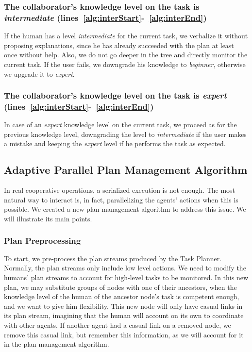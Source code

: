 \subsubsection{The collaborator's knowledge level on the task is \textit{intermediate} (lines~\ref{alg:interStart}-~\ref{alg:interEnd})}
 If the human has a level \textit{intermediate} for the current task, we verbalize it without proposing explanations, since he has already  succeeded with the plan at least once without help. Also, we do not go deeper in the tree and directly monitor the current task. If the user  fails, we downgrade his knowledge to \textit{beginner}, otherwise we upgrade it to \textit{expert}.

\subsubsection{The collaborator's knowledge level on the task is \textit{expert} (lines~\ref{alg:interStart}-~\ref{alg:interEnd})}
 In case of an \textit{expert} knowledge level on the current task, we  proceed as for the previous knowledge level, downgrading the level to \textit{intermediate} if the user makes a mistake and keeping the \textit{expert} level if he performs the task as expected.


\subsection{Adaptive Parallel Plan Management Algorithm}
\label{subsec:plan_management-adaptive_parallel_plan_manager}
In real cooperative operations, a serialized execution is not enough. The most natural way to interact is, in fact, parallelizing the agents' actions when this is possible. We created a new plan management algorithm to address this issue. We will illustrate its main points.

\subsubsection{Plan Preprocessing}
To start, we pre-process the plan streams produced by the Task Planner. Normally, the plan streams only include low level actions. We need to  modify the humans' plan streams to account for high-level tasks to be monitored. In this new plan, we may substitute groups of nodes with one of their ancestors, when the knowledge level of the human of the ancestor node's task is competent enough, and we want to give him flexibility. This new node will only have casual links in its plan stream, imagining that the human will account on its own to coordinate with other agents. If another agent had a casual link on a removed node, we remove this casual link, but remember this information, as we will account for it in the plan management algorithm.

